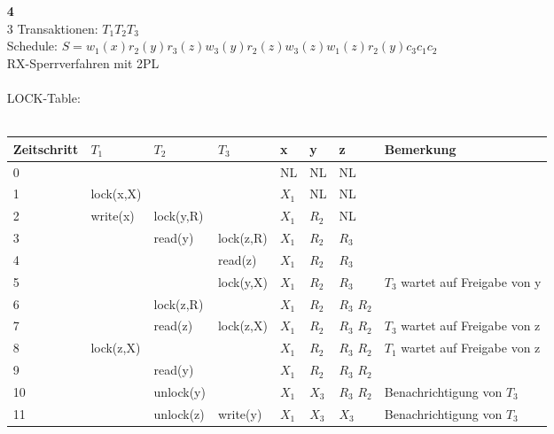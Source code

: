 \documentclass[a4paper,11pt,fleqn]{scrartcl}
\begin{document}
\begin{enumerate}
			\item[\textbf{4}]\quad \\
				3 Transaktionen: $T_1 T_2 T_3$ \\
				Schedule: $S = w_1(x) r_2(y) r_3(z) w_3(y) r_2(z) w_3(z) w_1(z) r_2(y) c_3 c_1 c_2$\\
				RX-Sperrverfahren mit 2PL\\
				\\
				LOCK-Table:\\
				\\
			\begin{tabular}{|p{2cm}|p{2cm}|p{2cm}|p{2cm}|p{1cm}|p{1cm}|p{1cm}|p{3cm}|}
				\hline
				Zeitschritt & $T_1$       & $T_2$       & $T_3$       & x     & y     & z     & Bemerkung\\
				\hline
				\hline
				0           &             &             &             & NL    & NL    & NL    & \\
				\hline
				1           & lock(x,X)   &             &             & $X_1$ & NL    & NL    & \\
				\hline
				2           & write(x)    & lock(y,R)   &             & $X_1$ & $R_2$ & NL    & \\
				\hline
				3           &             & read(y)     & lock(z,R)   & $X_1$ & $R_2$ & $R_3$ & \\
				\hline
				4           &             &             & read(z)     & $X_1$ & $R_2$ & $R_3$ & \\
				\hline
				5           &             &             & lock(y,X)   & $X_1$ & $R_2$ & $R_3$ & $T_3$ wartet auf Freigabe von y\\
				\hline
				6           &             & lock(z,R)   &             & $X_1$ & $R_2$ & $R_3$ $R_2$ & \\
				\hline
				7           &             & read(z)     & lock(z,X)   & $X_1$ & $R_2$ & $R_3$ $R_2$ & $T_3$ wartet auf Freigabe von z\\
				\hline
				8           & lock(z,X)   &             &             & $X_1$ & $R_2$ & $R_3$ $R_2$ & $T_1$ wartet auf Freigabe von z\\
				\hline
				9           &             & read(y)     &             & $X_1$ & $R_2$ & $R_3$ $R_2$ & \\
				\hline
				10          &             & unlock(y)   &             & $X_1$ & $X_3$ & $R_3$ $R_2$ & Benachrichtigung von $T_3$\\
				\hline
				11          &             & unlock(z)   & write(y)    & $X_1$ & $X_3$ & $X_3$ & Benachrichtigung von $T_3$\\

\end{tabular}
\end{enumerate}
\end{document}

